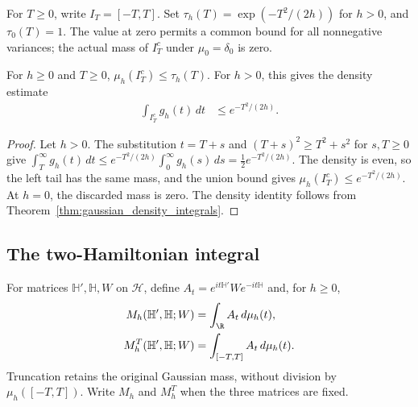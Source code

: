 For $T\ge0$, write $I_T=[-T,T]$. Set
$\tau_h(T)=\exp(-T^2/(2h))$ for $h>0$, and $\tau_0(T)=1$.
The value at zero permits a common bound for all nonnegative variances;
the actual mass of $I_T^c$ under $\mu_0=\delta_0$ is zero.

\begin{theorem}
    \label{thm:gaussian_tail}
    \leanok
    For $h\ge0$ and $T\ge0$, $\mu_h(I_T^c)\le\tau_h(T)$.
    For $h>0$, this gives the density estimate
    \begin{align}
        \int_{I_T^c}g_h(t)\,dt&\le e^{-T^2/(2h)}.
        \label{eq:gaussian_density_tail}
    \end{align}
\end{theorem}
\begin{proof}\leanok
    Let $h>0$. The substitution $t=T+s$ and $(T+s)^2\ge T^2+s^2$ for
    $s,T\ge0$ give $\int_T^\infty g_h(t)\,dt\le e^{-T^2/(2h)}
    \int_0^\infty g_h(s)\,ds=\tfrac12e^{-T^2/(2h)}$. The density is even, so
    the left tail has the same mass, and the union bound gives
    $\mu_h(I_T^c)\le e^{-T^2/(2h)}$. At $h=0$,
    the discarded mass is zero. The density identity follows from
    Theorem~\ref{thm:gaussian_density_integrals}.
\end{proof}

\subsection{The two-Hamiltonian integral}

\begin{definition}
    \label{def:gaussian_filter_integrals}
    \leanok
    For matrices $\mathbb H',\mathbb H,W$ on $\mathcal H$, define
    $A_t=e^{it\mathbb H'}We^{-it\mathbb H}$ and, for $h\ge0$,
    \begin{align}
        M_h(\mathbb H',\mathbb H;W)&=\int_{\R}A_t\,d\mu_h(t),
        \label{eq:gaussian_filters}\\
        M_h^T(\mathbb H',\mathbb H;W)&=\int_{[-T,T]}A_t\,d\mu_h(t). \notag
    \end{align}
    Truncation retains the original Gaussian mass, without division
    by $\mu_h([-T,T])$.
    Write $M_h$ and $M_h^T$ when the three matrices are fixed.
\end{definition}

